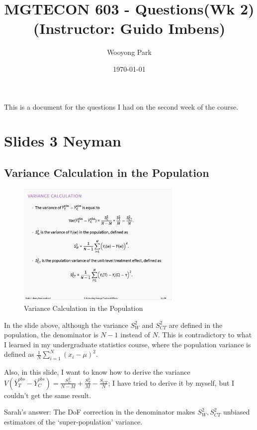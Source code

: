 \documentclass[11pt]{article}
\title{MGTECON 603 - Questions(Wk 2)\\ (Instructor: Guido Imbens)}
\author{Wooyong Park}
\date{\today}
\numberwithin{equation}{section}
\begin{document}
\maketitle

This is a document for the questions I had on the second week of the course.

\section{Slides 3 Neyman}

\subsection{Variance Calculation in the Population}

\begin{figure}[h]
    \centering
    \includegraphics[width=0.7\textwidth]{images/wk2-2.png}
    \caption{Variance Calculation in the Population}
    \label{fig:variance-calculation}
\end{figure}

In the slide above, although the variance $S_W^2$ and $S_{CT}^2$ are defined in the population, the denominator is $N-1$ instead of $N$.
This is contradictory to what I learned in my undergraduate statistics course, where the population variance is defined as $\frac{1}{N} \sum_{i=1}^N (x_i - \mu)^2$.

Also, in this slide, I want to know how to derive the variance $V(\overline{Y}_T^{obs}-\overline{Y}_C^{obs}) = \frac{S_C^2}{N-M}+\frac{S_T^2}{M} - \frac{S_{CT}}{N}$; I have tried to derive it by myself, but I couldn't get the same result.


{
\color{blue}
Sarah's answer: The DoF correction in the denominator makes $S_W^2, S_{CT}^2$ unbiased estimators of the `super-population' variance.

}
\end{document}
